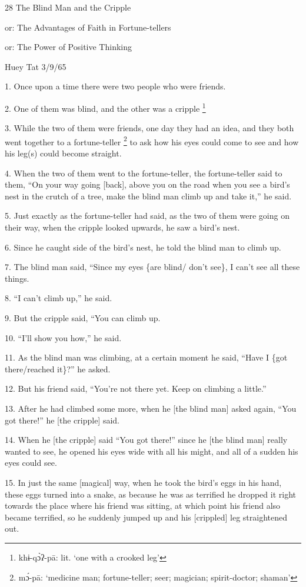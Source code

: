 
28 The Blind Man and the Cripple

or: The Advantages of Faith in Fortune-tellers

or: The Power of Positive Thinking

Huey Tat 3/9/65

1. Once upon a time there were two people who were friends.

2. One of them was blind, and the other was a cripple \.\footnote{khɨ-qɔ̀ʔ-pā: lit. `one with a crooked leg'}

3. While the two of them were friends, one day they had an idea, and they both
went together to a fortune-teller \footnote{mɔ́-pā: `medicine man; fortune-teller; seer; magician; spirit-doctor; shaman'} to ask how his eyes could come to see and
how his leg(s) could become straight.

4. When the two of them went to the fortune-teller, the fortune-teller said to
them, ``On your way going [back], above you on the road when you see a bird's nest
in the crutch of a tree, make the blind man climb up and take it,'' he said.

5. Just exactly as the fortune-teller had said, as the two of them were going on
their way, when the cripple looked upwards, he saw a bird's nest.

6. Since he caught side of the bird's nest, he told the blind man to climb up.

7. The blind man said, ``Since my eyes \{are blind/ don't see\}, I can't see all
these things.

8. ``I can't climb up,'' he said.

9. But the cripple said, ``You can climb up.

10. ``I'll show you how,'' he said.

11. As the blind man was climbing, at a certain moment he said, ``Have I \{got
there/reached it\}?'' he asked.

12. But his friend said, ``You're not there yet.  Keep on climbing a little.''

13. After he had climbed some more, when he [the blind man] asked again, ``You
got there!'' he [the cripple] said.

14. When he [the cripple] said ``You got there!'' since he [the blind man] really
wanted to see, he opened his eyes wide with all his might, and all of a sudden
his eyes could see.

15. In just the same [magical] way, when he took the bird's eggs in his hand, these
eggs turned into a snake, as because he was as terrified he dropped it right towards
the place where his friend was sitting, at which point his friend also became terrified,
so he suddenly jumped up and his [crippled] leg straightened out.

